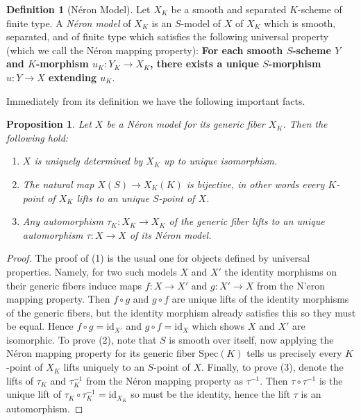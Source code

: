 \documentclass{article}
\theoremstyle{definition}
\newtheorem{definition}[theorem]{Definition}
\theoremstyle{remark}
\theoremstyle{plain}
\newtheorem{proposition}[theorem]{Proposition}
\begin{document}
\begin{definition}[N\'eron Model]\label{def:NM}
	Let $X_K$ be a smooth and separated $K$-scheme of finite type. A \textit{N\'eron model} of $X_K$ is an $S$-model of $X$  of $X_K$ which is smooth, separated, and of finite type which satisfies the following universal property (which we call the N\'eron mapping property): \textbf{For each smooth $S$-scheme $Y$ and $K$-morphism $u_K: Y_K \to X_K$, there exists a unique $S$-morphism $u: Y \to X$ extending $u_K$}.
\end{definition}

\noindent Immediately from its definition we have the following important facts.

\begin{proposition}
Let $X$ be a N\'eron model for its generic fiber $X_K$. Then the following hold:
\begin{enumerate}
  \item $X$ is uniquely determined by $X_K$ up to unique isomorphism.
  \item The natural map $X(S) \to X_K(K)$ is bijective, in other words every $K$-point of $X_K$ lifts to an unique $S$-point of $X$. 
  \item Any automorphism $\tau_K: X_K \to X_K$ of the generic fiber lifts to an unique automorphism $\tau: X \to X$ of its N\'eron model.
\end{enumerate}
\end{proposition}

\begin{proof}
	The proof of (1) is the usual one for objects defined by universal properties. Namely, for two such models $X$ and $X'$ the identity morphisms  on their generic fibers induce maps $f:X \to X'$ and $g: X' \to X$ from the N’eron mapping property. Then $f \circ g$ and $g \circ f$ are unique lifts of the identity morphisms of the generic fibers, but the identity morphism already satisfies this so they must be equal. 
	Hence $f \circ g = \text{id}_{X'}$ and $g \circ f = \text{id}_{X}$ which shows $X$ and $X'$ are isomorphic. \newline
	\indent To prove (2), note that $S$ is smooth over itself, now applying the N\'eron mapping property for its generic fiber $\text{Spec}(K)$ tells us precisely every $K$-point of $X_K$ lifts uniquely to an $S$-point of $X$. \newline
	\indent Finally, to prove (3), denote the lifts of $\tau_K$ and $\tau_K^{-1}$ from the N\'eron mapping property as $\tau^{-1}$.
Then $\tau \circ \tau^{-1}$ is the unique lift of $\tau_K \circ \tau_K^{-1} = \text{id}_{X_K}$ so must be the identity, hence the lift $\tau$ is an automorphism.
\end{proof}
\end{document}
